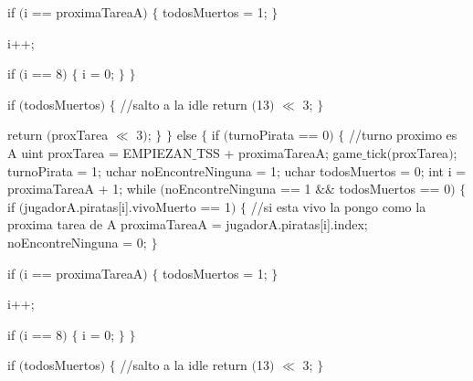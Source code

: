 \begin{algorithmic}
   \State \tab \tab  \tab \tab \tab     if $($i == proximaTareaA$)$ $\{$
          \State \tab \tab  \tab \tab \tab \tab todosMuertos = 1;
   \State \tab \tab  \tab \tab \tab     $\}$

   \State \tab \tab  \tab \tab \tab     i++;

   \State \tab \tab  \tab \tab \tab     if $($i == 8$)$ $\{$
         \State \tab \tab  \tab \tab \tab \tab  i = 0;
   \State \tab \tab  \tab \tab \tab     $\}$
  \State \tab \tab  \tab \tab    $\}$

  \State \tab \tab  \tab \tab    if $($todosMuertos$)$ $\{$
    \State \tab \tab  \tab \tab \tab    //salto a la idle
    \State \tab \tab  \tab \tab \tab    return $($13$)$ $\ll$ 3;
  \State \tab \tab  \tab \tab    $\}$

  \State \tab \tab  \tab \tab    return $($proxTarea $\ll$ 3$)$;
\State \tab \tab  \tab    $\}$
\State \tab \tab    $\}$ else $\{$
\State \tab \tab  \tab    if $($turnoPirata == 0$)$ $\{$
     \State \tab \tab  \tab \tab  //turno proximo es A
      \State \tab \tab  \tab \tab  uint proxTarea = EMPIEZAN$\_$TSS + proximaTareaA;
      \State \tab \tab  \tab \tab  game$\_$tick$($proxTarea$)$;
      \State \tab \tab  \tab \tab  turnoPirata = 1;
      \State \tab \tab  \tab \tab  uchar noEncontreNinguna = 1;
      \State \tab \tab  \tab \tab  uchar todosMuertos = 0;
      \State \tab \tab  \tab \tab  int i = proximaTareaA + 1;
      \State \tab \tab  \tab \tab  while $($noEncontreNinguna == 1 $\&\&$ todosMuertos == 0$)$ $\{$
   \State \tab \tab  \tab \tab \tab     if $($jugadorA.piratas[i].vivoMuerto == 1$)$ $\{$
         \State \tab \tab  \tab \tab  \tab \tab //si esta vivo la pongo como la proxima tarea de A
         \State \tab \tab  \tab \tab \tab \tab proximaTareaA = jugadorA.piratas[i].index;
          \State \tab \tab  \tab \tab \tab \tab  noEncontreNinguna = 0;
   \State \tab \tab  \tab \tab \tab     $\}$

    \State \tab \tab  \tab \tab \tab    if $($i == proximaTareaA$)$ $\{$
         \State \tab \tab  \tab \tab \tab \tab todosMuertos = 1;
    \State \tab \tab  \tab \tab \tab    $\}$

    \State \tab \tab  \tab \tab \tab    i++;

    \State \tab \tab  \tab \tab \tab    if $($i == 8$)$ $\{$
        \State \tab \tab  \tab \tab \tab \tab  i = 0;
    \State \tab \tab  \tab \tab \tab    $\}$
    \State \tab \tab  \tab \tab    $\}$

      \State \tab \tab  \tab \tab  if $($todosMuertos$)$ $\{$
        //salto a la idle
        \State \tab \tab  \tab \tab \tab return $($13$)$ $\ll$ 3;
      \State \tab \tab  \tab \tab  $\}$


\end{algorithmic}
